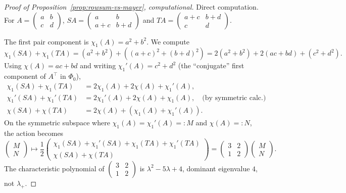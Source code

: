 ﻿\documentclass[11pt]{article}
\theoremstyle{definition}
\newcommand{\N}{\mathbf{N}}
\newcommand{\Phio}{\Phi_0}
\newcommand{\chiA}{\chi}
\begin{document}
\begin{proof}[Proof of Proposition~\ref{prop:rowsum-vs-mayer}, computational]
Direct computation. For $A=\begin{pmatrix}a&b\\c&d\end{pmatrix}$, $SA=\begin{pmatrix}a&b\\a+c&b+d\end{pmatrix}$ and $TA=\begin{pmatrix}a+c&b+d\\c&d\end{pmatrix}$.

The first pair component is $\chi_1(A)=a^2+b^2$. We compute
\[
\chi_1(SA)+\chi_1(TA) = (a^2+b^2) + ((a+c)^2+(b+d)^2) = 2(a^2+b^2)+2(ac+bd)+(c^2+d^2).
\]
Using $\chiA(A)=ac+bd$ and writing $\chi_1'(A)=c^2+d^2$ (the ``conjugate'' first component of $A^\top$ in $\Phio$),
\begin{align*}
\chi_1(SA)+\chi_1(TA) &= 2\chi_1(A) + 2\chiA(A) + \chi_1'(A),\\
\chi_1'(SA)+\chi_1'(TA) &= 2\chi_1'(A) + 2\chiA(A) + \chi_1(A),\quad\text{(by symmetric calc.)}\\
\chiA(SA)+\chiA(TA) &= 2\chiA(A) + (\chi_1(A)+\chi_1'(A)).
\end{align*}
On the symmetric subspace where $\chi_1(A)=\chi_1'(A)=:M$ and $\chiA(A)=:N$, the action becomes
\[
\begin{pmatrix}M\\N\end{pmatrix}\mapsto \frac{1}{2}\begin{pmatrix}\chi_1(SA)+\chi_1'(SA)+\chi_1(TA)+\chi_1'(TA)\\\chiA(SA)+\chiA(TA)\end{pmatrix} = \begin{pmatrix}3&2\\1&2\end{pmatrix}\begin{pmatrix}M\\N\end{pmatrix}.
\]
The characteristic polynomial of $\begin{pmatrix}3&2\\1&2\end{pmatrix}$ is $\lambda^2-5\lambda+4$, dominant eigenvalue $4$, not $\lambda_+$.


\end{proof}
\end{document}
